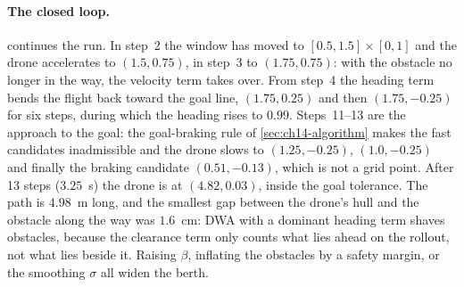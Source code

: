 \paragraph{The closed loop.}
 continues the run. In step~2 the window has moved to
$[0.5, 1.5] \times [0, 1]$ and the drone accelerates to $(1.5, 0.75)$, in
step~3 to $(1.75, 0.75)$: with the obstacle no longer in the way, the
velocity term takes over. From step~4 the heading term bends the flight back
toward the goal line, $(1.75, 0.25)$ and then $(1.75, -0.25)$ for six
steps, during which the heading rises to $0.99$. Steps~11--13 are the
approach to the goal: the goal-braking rule of
\cref{sec:ch14-algorithm} makes the fast candidates inadmissible and the
drone slows to $(1.25, -0.25)$, $(1.0, -0.25)$ and finally the braking
candidate $(0.51, -0.13)$, which is not a grid point. After 13 steps
($3.25$~s) the drone is at $(4.82, 0.03)$, inside the goal tolerance. The
path is $4.98$~m long, and the smallest gap between the drone's hull and
the obstacle along the way was $1.6$~cm: DWA with a dominant heading term
shaves obstacles, because the clearance term only counts what lies ahead on
the rollout, not what lies beside it. Raising $\beta$, inflating the obstacles
by a safety margin, or the smoothing $\sigma$ all widen the berth.

